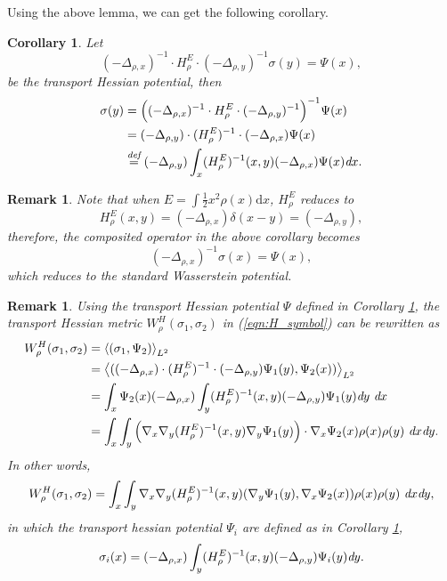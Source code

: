 \documentclass[11pt]{book}
\newtheorem{corollary}[theorem]{Corollary}
\newtheorem{remark}[theorem]{Remark}
\begin{document}
Using the above lemma, we can get the following corollary.
\begin{corollary}\label{corollary:HessianPotential}
Let
\[
 (-\Delta_{\rho,x})^{-1}\cdot H_{\rho}^E \cdot(-\Delta_{\rho,y})^{-1} \sigma(y) = \Psi(x),
\]
be the transport Hessian potential,  then 
\begin{align*}
\sigma(y) &= \Big( (-\Delta_{\rho,x})^{-1}\cdot H_{\rho}^E \cdot(-\Delta_{\rho,y} )^{-1} \Big)^{-1}\Psi(x)  \\
&= (-\Delta_{\rho,y})\cdot (H_{\rho}^E)^{-1} \cdot(-\Delta_{\rho,x})  \Psi(x) \\
& \stackrel{\emph{def}}{=} (-\Delta_{\rho,y}) \int_x  (H_{\rho}^E)^{-1}(x,y) (-\Delta_{\rho,x})\Psi(x) \emph{d}x.
\end{align*}
\end{corollary}

\begin{remark}
Note that when $E = \int \frac{1}{2}x^2 \rho(x) \text{d}x$, $H_{\rho}^E$ reduces to 
\[
H_{\rho}^E(x,y) = (-\Delta_{\rho,x})\delta(x-y) = (-\Delta_{\rho,y}),
\]
therefore, the composited operator in the above corollary becomes
\[
(-\Delta_{\rho,x})^{-1}\sigma(x) = \Psi(x),
\]
which reduces to the standard Wasserstein potential.
\end{remark}

\begin{remark}
Using the transport Hessian potential $\Psi$ defined in Corollary \ref{corollary:HessianPotential}, the transport Hessian metric $W_{\rho}^H(\sigma_1,\sigma_2)$ in (\ref{eqn:H_symbol}) can be rewritten as 
\begin{align*}
W_{\rho}^H(\sigma_1,\sigma_2) &= \left\langle (\sigma_1, \Psi_2)  \right\rangle_{L^2} \\
& = \left\langle ((-\Delta_{\rho,x})\cdot (H_{\rho}^E)^{-1}\cdot(-\Delta_{\rho,y})\Psi_1(y), \Psi_2(x))  \right\rangle_{L^2} \\
& = \int_x \Psi_2(x) (-\Delta_{\rho,x}) \int_y (H_{\rho}^E)^{-1}(x,y)(-\Delta_{\rho,y})\Psi_1(y) \emph{d}y \ \emph{d}x \\
& = \int_x \int_y \Big( \nabla_x\nabla_y (H_{\rho}^E)^{-1}(x,y) \nabla_y\Psi_1(y) \Big)\cdot \nabla_x\Psi_2(x) \rho(x)\rho(y)\ \emph{d}x\emph{d}y.
\end{align*}
In other words, 
\begin{align*}
W_{\rho}^H(\sigma_1,\sigma_2)  = \int_x \int_y  \nabla_x\nabla_y (H_{\rho}^E)^{-1}(x,y) (\nabla_y\Psi_1(y), \nabla_x\Psi_2(x) ) \rho(x)\rho(y)\ \emph{d}x\emph{d}y,
\end{align*}
in which the transport hessian potential $\Psi_i$ are defined as in Corollary \ref{corollary:HessianPotential},
\begin{align*}
\sigma_i(x) = (-\Delta_{\rho,x}) \int_y  (H_{\rho}^E)^{-1}(x,y) (-\Delta_{\rho,y})\Psi_i(y) \emph{d}y.
\end{align*}
\end{remark}
\end{document}
